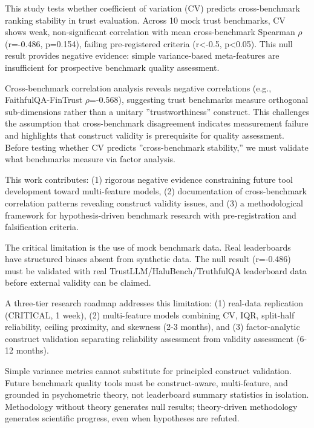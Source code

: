 
This study tests whether coefficient of variation (CV) predicts cross-benchmark ranking stability in trust evaluation. Across 10 mock trust benchmarks, CV shows weak, non-significant correlation with mean cross-benchmark Spearman $\rho$ (r=-0.486, p=0.154), failing pre-registered criteria (r<-0.5, p<0.05). This null result provides negative evidence: simple variance-based meta-features are insufficient for prospective benchmark quality assessment.

Cross-benchmark correlation analysis reveals negative correlations (e.g., FaithfulQA-FinTrust $\rho$=-0.568), suggesting trust benchmarks measure orthogonal sub-dimensions rather than a unitary ''trustworthiness'' construct. This challenges the assumption that cross-benchmark disagreement indicates measurement failure and highlights that construct validity is prerequisite for quality assessment. Before testing whether CV predicts ''cross-benchmark stability,'' we must validate what benchmarks measure via factor analysis.

This work contributes: (1) rigorous negative evidence constraining future tool development toward multi-feature models, (2) documentation of cross-benchmark correlation patterns revealing construct validity issues, and (3) a methodological framework for hypothesis-driven benchmark research with pre-registration and falsification criteria.

The critical limitation is the use of mock benchmark data. Real leaderboards have structured biases absent from synthetic data. The null result (r=-0.486) must be validated with real TrustLLM/HaluBench/TruthfulQA leaderboard data before external validity can be claimed.

A three-tier research roadmap addresses this limitation: (1) real-data replication (CRITICAL, 1 week), (2) multi-feature models combining CV, IQR, split-half reliability, ceiling proximity, and skewness (2-3 months), and (3) factor-analytic construct validation separating reliability assessment from validity assessment (6-12 months).

Simple variance metrics cannot substitute for principled construct validation. Future benchmark quality tools must be construct-aware, multi-feature, and grounded in psychometric theory, not leaderboard summary statistics in isolation. Methodology without theory generates null results; theory-driven methodology generates scientific progress, even when hypotheses are refuted.
